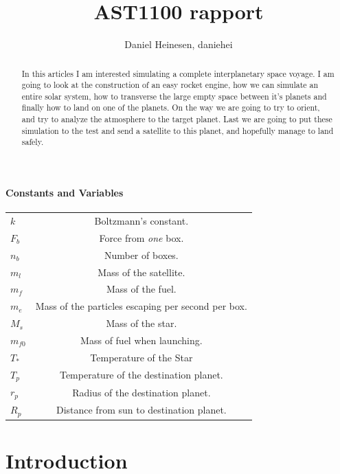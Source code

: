 \documentclass[a4paper, 10pt]{article}
\title{AST1100 rapport}
\author{Daniel Heinesen, daniehei}
\begin{document}
\maketitle

\begin{abstract}
In this articles I am interested simulating a complete interplanetary space voyage. I am going to look at the construction of an easy rocket engine, how we can simulate an entire solar system, how to transverse the large empty space between it's planets and finally how to land on one of the planets. On the way we are going to try to orient, and try to analyze the atmosphere to the target planet. Last we are going to put these simulation to the test and send a satellite to this planet, and hopefully manage to land safely.
\end{abstract} 

\paragraph*{Constants and Variables}

\begin{center}
\begin{tabular}{l  c}
$k$ & Boltzmann's constant.\\
$F_b$ & Force from \textit{one} box. \\
$n_b$ & Number of boxes.\\
$m_l$ & Mass of the satellite. \\
$m_f$ & Mass of the fuel.\\
$m_e$ & Mass of the particles escaping per second per box. \\
$M_s$ & Mass of the star.\\
$m_{f0}$ & Mass of fuel when launching. \\
$T_*$ & Temperature of the Star\\
$T_p$ & Temperature of the destination planet. \\
$r_p$ & Radius of the destination planet. \\
$R_p$ & Distance from sun to destination planet. \\
\end{tabular}
\end{center}



\tableofcontents

\section{Introduction}
\end{document}
